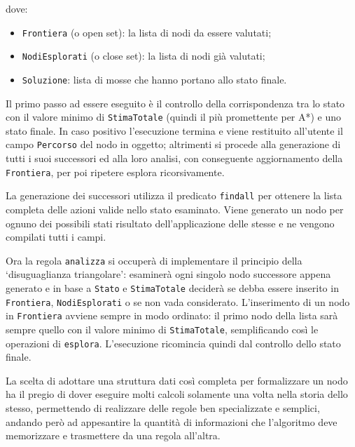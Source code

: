 \documentclass[a4paper,oneside,12pt]{book}
\def \code#1{\texttt{#1}}
\begin{document}
    dove:
    \begin{itemize}
        \item \code{Frontiera} (o open set): la lista di nodi da essere valutati;
        \item \code{NodiEsplorati} (o close set): la lista di nodi già valutati;
        \item \code{Soluzione}: lista di mosse che hanno portano allo stato finale.
    \end{itemize}

    Il primo passo ad essere eseguito è il controllo della corrispondenza tra lo stato con il valore minimo di \code{StimaTotale} (quindi il più promettente per A*) e uno stato finale. In caso positivo l’esecuzione termina e viene restituito all’utente il campo \code{Percorso} del nodo in oggetto; altrimenti si procede alla generazione di tutti i suoi successori ed alla loro analisi, con conseguente aggiornamento della \code{Frontiera}, per poi ripetere esplora ricorsivamente.

    La generazione dei successori utilizza il predicato \code{findall} per ottenere la lista completa delle azioni valide nello stato esaminato. Viene generato un nodo per ognuno dei possibili stati risultato dell’applicazione delle stesse e ne vengono compilati tutti i campi.

    Ora la regola \code{analizza} si occuperà di implementare il principio della ‘disuguaglianza triangolare’: esaminerà ogni singolo nodo successore appena generato e in base a \code{Stato} e \code{StimaTotale} deciderà se debba essere inserito in \code{Frontiera}, \code{NodiEsplorati} o se non vada considerato. L’inserimento di un nodo in \code{Frontiera} avviene sempre in modo ordinato: il primo nodo della lista sarà sempre quello con il valore minimo di \code{StimaTotale}, semplificando così le operazioni di \code{esplora}. L’esecuzione ricomincia quindi dal controllo dello stato finale.

    La scelta di adottare una struttura dati così completa per formalizzare un nodo ha il pregio di dover eseguire molti calcoli solamente una volta nella storia dello stesso, permettendo di realizzare delle regole ben specializzate e semplici, andando però ad appesantire la quantità di informazioni che l’algoritmo deve memorizzare e trasmettere da una regola all’altra.
\end{document}
